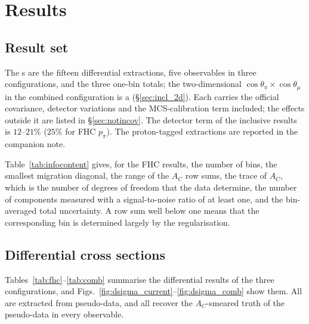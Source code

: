 \documentclass[11pt,a4paper]{article}
\begin{document}
\section{Results}
\label{sec:results}
\label{sec:rhc}

\subsection{Result set}
\label{sec:status_matrix}

The \statPrimary{}s are the fifteen differential extractions, five
observables in three configurations, and the three one-bin totals; the two-dimensional
$\cos\theta_\pi\times\cos\theta_\mu$ in the combined configuration is a \statSecondary{}
(\S\ref{sec:incl_2d}). Each carries the official covariance, detector variations and the
MCS-calibration term included; the effects outside it are listed in \S\ref{sec:notincov}. The
detector term of the inclusive results is $12$--$21\%$ ($25\%$ for FHC $p_\pi$). The proton-tagged
extractions are reported in the companion note.

%


Table~\ref{tab:infocontent} gives, for the FHC results, the number of bins, the smallest migration
diagonal, the range of the $A_C$ row sums, the trace of $A_C$, which is the number of degrees of
freedom that the data determine, the number of components measured with a signal-to-noise ratio of
at least one, and the bin-averaged total uncertainty. A row sum well below one means that the
corresponding bin is determined largely by the regularisation.



\subsection{Differential cross sections}

Tables~\ref{tab:fhc}--\ref{tab:comb} summarise the differential results of the three
configurations, and Figs.~\ref{fig:dsigma_current}--\ref{fig:dsigma_comb} show them. All are
extracted from pseudo-data, and all recover the $A_C$-smeared truth of the pseudo-data in every
observable.
\end{document}
